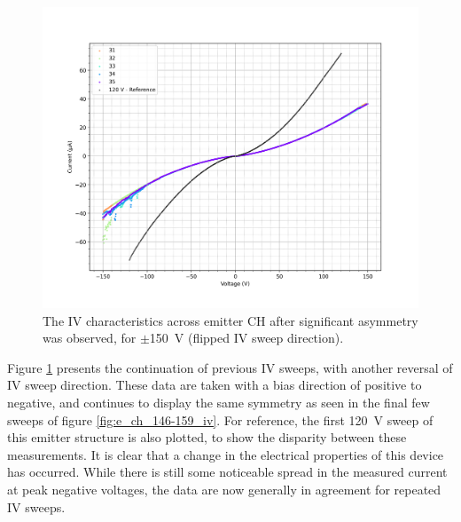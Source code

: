 \begin{refsection}
\begin{figure}[H]
    \centering
    \includegraphics[width=\linewidth]{Chapter7/Figs/Raster/Emitters/160-164_iv.png}
    \caption{The IV characteristics across emitter CH after significant asymmetry was observed, for $\pm$150~\si{\volt} (flipped IV sweep direction).}
    \label{fig:e_ch_160-164_iv}
\end{figure}

Figure \ref{fig:e_ch_160-164_iv} presents the continuation of previous IV sweeps, with another reversal of IV sweep direction. These data are taken with a bias direction of positive to negative, and continues to display the same symmetry as seen in the final few sweeps of figure \ref{fig:e_ch_146-159_iv}. For reference, the first 120~\si{\volt} sweep of this emitter structure is also plotted, to show the disparity between these measurements. It is clear that a change in the electrical properties of this device has occurred. While there is still some noticeable spread in the measured current at peak negative voltages, the data are now generally in agreement for repeated IV sweeps.


\end{refsection}
